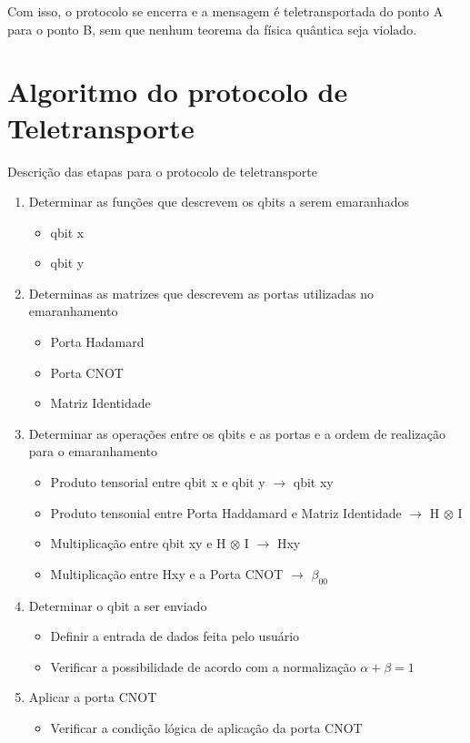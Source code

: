 Com isso, o protocolo se encerra e a mensagem é teletransportada do ponto A para o ponto B, sem que nenhum teorema da física quântica seja violado.


\section{Algoritmo do protocolo de Teletransporte}

Descrição das etapas para o protocolo de teletransporte

\begin{enumerate}
\item Determinar as funções que descrevem os qbits a serem emaranhados
	\begin{itemize}
	\item qbit x
	\item qbit y
	\end{itemize}
\item Determinas as matrizes que descrevem as portas utilizadas no emaranhamento
	\begin{itemize}
	\item Porta Hadamard
	\item Porta CNOT
	\item Matriz Identidade
	\end{itemize}
\item Determinar as operações entre os qbits e as portas e a ordem de realização para o emaranhamento
	\begin{itemize}
	\item Produto tensorial entre qbit x e qbit y $\rightarrow$ qbit xy
	\item Produto tensonial entre Porta Haddamard e Matriz Identidade $\rightarrow$ H $\otimes$ I
	\item Multiplicação entre qbit xy e H $\otimes$ I $\rightarrow$ Hxy
	\item Multiplicação entre Hxy e a Porta CNOT $\rightarrow$ $\beta _00$
	\end{itemize}
\item Determinar o qbit a ser enviado
	\begin{itemize}
	\item Definir a entrada de dados feita pelo usuário
	\item Verificar a possibilidade de acordo com a normalização $\alpha + \beta =1$
	\end{itemize}
\item Aplicar a porta CNOT
	\begin{itemize}
	\item Verificar a condição lógica de aplicação da porta CNOT

\end{itemize}
\end{enumerate}
